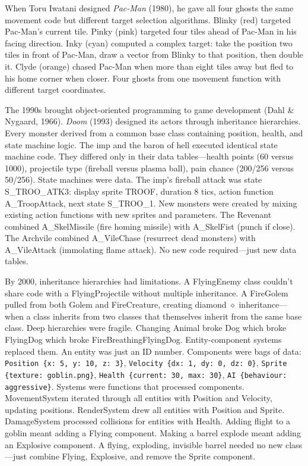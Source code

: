  When Toru Iwatani designed \emph{Pac-Man} (1980), he gave all four ghosts the same movement code but different target selection algorithms. Blinky (red) targeted Pac-Man's current tile. Pinky (pink) targeted four tiles ahead of Pac-Man in his facing direction. Inky (cyan) computed a complex target: take the position two tiles in front of Pac-Man, draw a vector from Blinky to that position, then double it. Clyde (orange) chased Pac-Man when more than eight tiles away but fled to his home corner when closer. Four ghosts from one movement function with different target coordinates.

The 1990s brought object-oriented programming to game development (Dahl \& Nygaard, 1966). \emph{Doom} (1993) designed its actors through inheritance hierarchies. Every monster derived from a common base class containing position, health, and state machine logic. The imp and the baron of hell executed identical state machine code. They differed only in their data tables—health points (60 versus 1000), projectile type (fireball versus plasma ball), pain chance (200/256 versus 50/256). State machines were data. The imp's fireball attack was state S\_TROO\_ATK3: display sprite TROOF, duration 8 tics, action function A\_TroopAttack, next state S\_TROO\_1. New monsters were created by mixing existing action functions with new sprites and parameters. The Revenant combined A\_SkelMissile (fire homing missile) with A\_SkelFist (punch if close). The Archvile combined A\_VileChase (resurrect dead monsters) with A\_VileAttack (immolating flame attack). No new code required—just new data tables.

By 2000, inheritance hierarchies had limitations. A FlyingEnemy class couldn't share code with a FlyingProjectile without multiple inheritance. A FireGolem pulled from both Golem and FireCreature, creating diamond $\diamond$ inheritance—when a class inherits from two classes that themselves inherit from the same base class. Deep hierarchies were fragile. Changing Animal broke Dog which broke FlyingDog which broke FireBreathingFlyingDog. Entity-component systems replaced them. An entity was just an ID number. Components were bags of data: \texttt{Position \{x: 5, y: 10, z: 3\}}, \texttt{Velocity \{dx: 1, dy: 0, dz: 0\}}, \texttt{Sprite \{texture: \QSOpen{}goblin.png\QSClose{}\}}, \texttt{Health \{current: 30, max: 30\}}, \texttt{AI \{behaviour: \QSOpen{}aggressive\QSClose{}\}}. Systems were functions that processed components. MovementSystem iterated through all entities with Position and Velocity, updating positions. RenderSystem drew all entities with Position and Sprite. DamageSystem processed collisions for entities with Health. Adding flight to a goblin meant adding a Flying component. Making a barrel explode meant adding an Explosive component. A flying, exploding, invisible barrel needed no new class—just combine Flying, Explosive, and remove the Sprite component.


